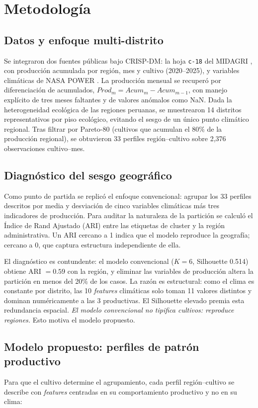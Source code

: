 \documentclass[conference]{IEEEtran}
\begin{document}
\section{Metodología}

\subsection{Datos y enfoque multi-distrito}
Se integraron dos fuentes públicas bajo CRISP-DM: la hoja \texttt{c-18} del MIDAGRI \cite{midagrihist}, con producción acumulada por región, mes y cultivo (2020--2025), y variables climáticas de NASA POWER \cite{nasa2025}. La producción mensual se recuperó por diferenciación de acumulados, $Prod_m = Acum_m - Acum_{m-1}$, con manejo explícito de tres meses faltantes y de valores anómalos como NaN. Dada la heterogeneidad ecológica de las regiones peruanas, se muestrearon 14 distritos representativos por piso ecológico, evitando el sesgo de un único punto climático regional. Tras filtrar por Pareto-80 (cultivos que acumulan el 80\% de la producción regional), se obtuvieron 33 perfiles región--cultivo sobre 2{,}376 observaciones cultivo--mes.

\subsection{Diagnóstico del sesgo geográfico}
Como punto de partida se replicó el enfoque convencional: agrupar los 33 perfiles descritos por media y desviación de cinco variables climáticas más tres indicadores de producción. Para auditar la naturaleza de la partición se calculó el Índice de Rand Ajustado (ARI) entre las etiquetas de cluster y la región administrativa. Un ARI cercano a 1 indica que el modelo reproduce la geografía; cercano a 0, que captura estructura independiente de ella.

El diagnóstico es contundente: el modelo convencional ($K=6$, Silhouette 0.514) obtiene ARI $=0.59$ con la región, y eliminar las variables de producción altera la partición en menos del 20\% de los casos. La razón es estructural: como el clima es constante por distrito, las 10 \textit{features} climáticas solo toman 11 valores distintos y dominan numéricamente a las 3 productivas. El Silhouette elevado premia esta redundancia espacial. \emph{El modelo convencional no tipifica cultivos: reproduce regiones.} Esto motiva el modelo propuesto.

\subsection{Modelo propuesto: perfiles de patrón productivo}
Para que el cultivo determine el agrupamiento, cada perfil región--cultivo se describe con \textit{features} centradas en su comportamiento productivo y no en su clima:
\end{document}
